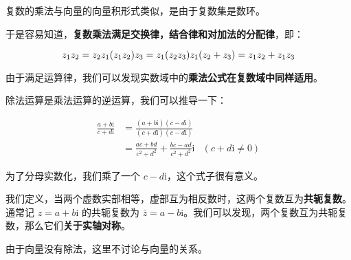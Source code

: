 复数的乘法与向量的向量积形式类似，是由于复数集是数环。

于是容易知道，\textbf{复数乘法满足交换律，结合律和对加法的分配律}，即：

$$
z_1z_2=z_2z_1\\
(z_1z_2)z_3=z_1(z_2z_3)\\
z_1(z_2+z_3)=z_1z_2+z_1z_3
$$

由于满足运算律，我们可以发现实数域中的\textbf{乘法公式在复数域中同样适用}。

除法运算是乘法运算的逆运算，我们可以推导一下：

$$
\begin{align}
\frac{a+b\text{i}}{c+d\text{i}}&=\frac{(a+b\text{i})(c-d\text{i})}{(c+d\text{i})(c-d\text{i})}\\
&=\frac{ac+bd}{c^2+d^2}+\frac{bc-ad}{c^2+d^2}\text{i} &(c+d\text{i}\not =0)
\end{align}
$$

为了分母实数化，我们乘了一个 $c-d\text{i}$，这个式子很有意义。

我们定义，当两个虚数实部相等，虚部互为相反数时，这两个复数互为\textbf{共轭复数}。通常记 $z=a+b\text{i}$ 的共轭复数为 $\bar z=a-b\text{i}$。我们可以发现，两个复数互为共轭复数，那么它们\textbf{关于实轴对称}。

由于向量没有除法，这里不讨论与向量的关系。
